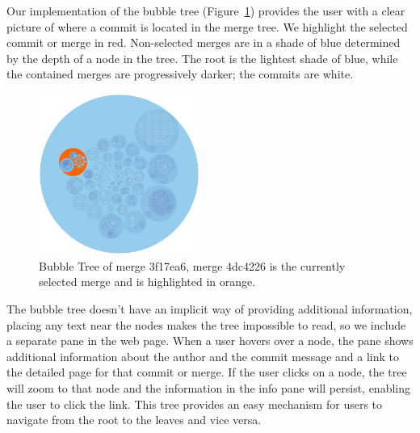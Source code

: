 Our implementation of the bubble tree (Figure~\ref{fig:bubble_tree})
provides the user with a clear picture of where a commit is located in
the merge tree. We highlight the selected commit or merge in red.
Non-selected merges are in a shade of blue determined by the depth of a
node in the tree. The root is the lightest shade of blue, while the
contained merges are progressively darker; the commits are white.

\begin{figure}
        \centering
        \includegraphics[width=0.47\textwidth]{figures/bubble_tree.pdf}
        \caption{Bubble Tree of merge 3f17ea6, merge 4dc4226 is the currently
          selected merge and is highlighted in orange.}
        \label{fig:bubble_tree}
\end{figure}

The bubble tree doesn't have an implicit way of providing additional
information, placing any text near the nodes makes the tree impossible
to read, so we include a separate pane in the web page. When a user
hovers over a node, the pane shows additional information about the
author and the commit message and a link to the detailed page for that
commit or merge. If the user clicks on a node, the tree will zoom to
that node and the information in the info pane will persist, enabling
the user to click the link. This tree provides an easy mechanism for
users to navigate from the root to the leaves and vice versa.




